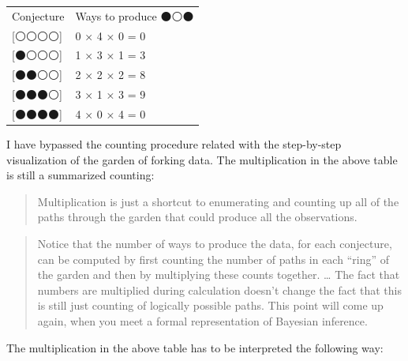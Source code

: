 \documentclass[
  letterpaper,
  DIV=11,
  numbers=noendperiod]{scrreprt}
\begin{document}
\begin{longtable}[]{@{}ll@{}}
\toprule\noalign{}
\endhead
\bottomrule\noalign{}
\endlastfoot
Conjecture & Ways to produce ⚫⚪⚫ \\
{[}⚪⚪⚪⚪{]} & 0 × 4 × 0 = 0 \\
{[}⚫⚪⚪⚪{]} & 1 × 3 × 1 = 3 \\
{[}⚫⚫⚪⚪{]} & 2 × 2 × 2 = 8 \\
{[}⚫⚫⚫⚪{]} & 3 × 1 × 3 = 9 \\
{[}⚫⚫⚫⚫{]} & 4 × 0 × 4 = 0 \\
\end{longtable}

I have bypassed the counting procedure related with the step-by-step
visualization of the garden of forking data. The multiplication in the
above table is still a summarized counting:

\begin{tcolorbox}[enhanced jigsaw, colframe=quarto-callout-important-color-frame, colback=white, toprule=.15mm, breakable, arc=.35mm, bottomtitle=1mm, colbacktitle=quarto-callout-important-color!10!white, toptitle=1mm, titlerule=0mm, title=\textcolor{quarto-callout-important-color}{\faExclamation}\hspace{0.5em}{Important}, leftrule=.75mm, opacityback=0, rightrule=.15mm, opacitybacktitle=0.6, bottomrule=.15mm, left=2mm, coltitle=black]

\begin{quote}
Multiplication is just a shortcut to enumerating and counting up all of
the paths through the garden that could produce all the observations.
\end{quote}

\end{tcolorbox}

\begin{quote}
Notice that the number of ways to produce the data, for each conjecture,
can be computed by first counting the number of paths in each ``ring''
of the garden and then by multiplying these counts together. \ldots{}
The fact that numbers are multiplied during calculation doesn't change
the fact that this is still just counting of logically possible paths.
This point will come up again, when you meet a formal representation of
Bayesian inference.
\end{quote}

The multiplication in the above table has to be interpreted the
following way:
\end{document}
